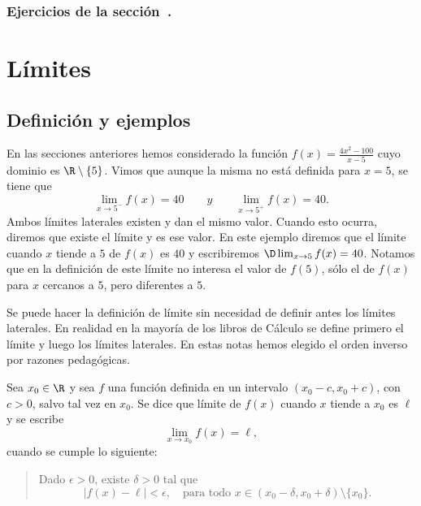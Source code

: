 \subsubsection*{Ejercicios de la sección~.}

\begin{enumerate}

\end{enumerate}

\section{Límites}

\subsection{Definición y ejemplos}

En las secciones anteriores hemos considerado la función $f(x)=\frac{4x^2-100}{x-5}$ cuyo dominio es $\R\setminus\{5\}$.
Vimos que aunque la misma no está definida para $x=5$, se tiene que
\[
\lim_{x\to 5^-} f(x) = 40\qquad{y}\qquad
\lim_{x\to 5^+} f(x) = 40.
\]
Ambos límites laterales existen y dan el mismo valor.
Cuando esto ocurra, diremos que existe el límite y es ese valor. En este ejemplo diremos que el límite cuando $x$ tiende a $5$ de $f(x)$ es $40$ y escribiremos $\D\lim_{x\to5}f(x)=40$. Notamos que en la definición de este límite no interesa el valor de $f(5)$, sólo el de $f(x)$ para $x$ cercanos a $5$, pero diferentes a $5$.

Se puede hacer la definición de límite sin necesidad de definir antes los límites laterales. En realidad en la mayoría de los libros de Cálculo se define primero el límite y luego los límites laterales. En estas notas hemos elegido el orden inverso por razones pedagógicas.

\begin{definition}[Límite]\label{D:limite}
    Sea $x_0\in\R$ y sea $f$ una función definida en un intervalo $(x_0-c,x_0+c)$, con $c>0$, salvo tal vez en $x_0$. Se dice que límite de $f(x)$ cuando $x$ tiende a $x_0$ es $\ell$ y se escribe
    \[
    \lim_{x\to x_0}f(x)=\ell,
    \]
    cuando se cumple lo siguiente:
    \begin{quote}
        Dado $\epsilon > 0$, existe $\delta > 0$ tal que 
        \[
        |f(x)-\ell| < \epsilon, \quad\text{para todo $x\in (x_0-\delta,x_0+\delta)\setminus\{x_0\}$}
        .
        \]
    \end{quote}
\end{definition}

